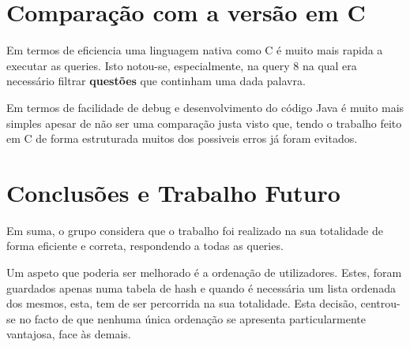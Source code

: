 \documentclass[10pt,a4paper]{report}
\begin{document}
\chapter{Comparação com a versão em C}
    Em termos de eficiencia uma linguagem nativa como C é muito mais rapida a
    executar as queries. Isto notou-se, especialmente, na query 8 na qual era
    necessário filtrar \textbf{questões} que continham uma dada palavra.

    Em termos de facilidade de debug e desenvolvimento do código Java é muito mais
    simples apesar de não ser uma comparação justa visto que, tendo o trabalho
    feito em C de forma estruturada muitos dos possiveis erros já foram evitados.

\chapter{Conclusões e Trabalho Futuro}
    Em suma, o grupo considera que o trabalho foi realizado na sua
    totalidade de forma eficiente e correta, respondendo a todas as queries.

    Um aspeto que poderia ser melhorado é a ordenação de utilizadores. Estes,
    foram guardados apenas numa tabela de hash e quando é necessária um lista
    ordenada dos mesmos, esta, tem de ser percorrida na sua totalidade. Esta
    decisão, centrou-se no facto de que nenhuma única ordenação se apresenta
    particularmente vantajosa, face às demais.
\end{document}
